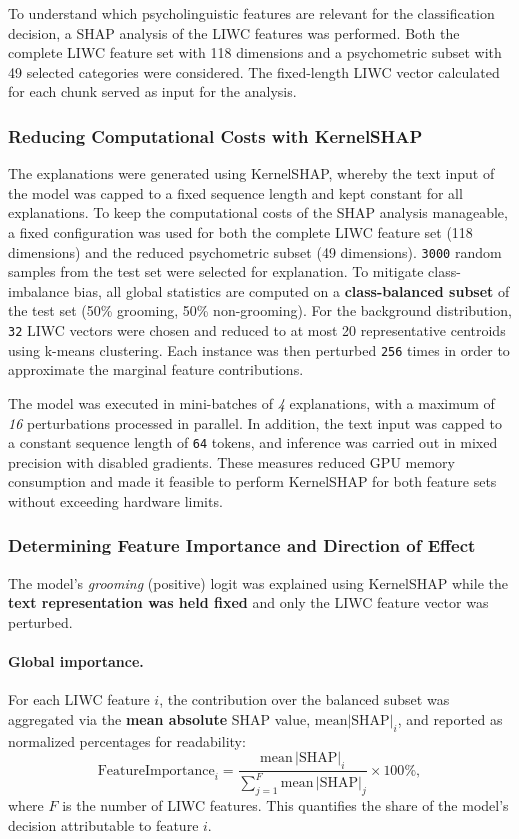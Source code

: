 To understand which psycholinguistic features are relevant for the classification decision, a SHAP analysis of the LIWC features was performed. Both the complete LIWC feature set with 118 dimensions and a psychometric subset with 49 selected categories were considered. The fixed-length LIWC vector calculated for each chunk served as input for the analysis. 

\subsubsection{Reducing Computational Costs with KernelSHAP}
The explanations were generated using KernelSHAP, whereby the text input of the model was capped to a fixed sequence length and kept constant for all explanations. To keep the computational costs of the SHAP analysis manageable, a fixed configuration was used for both the complete LIWC feature set (118 dimensions) and the reduced psychometric subset (49 dimensions).  \texttt{3000} random samples from the test set were selected for explanation. To mitigate class-imbalance bias, all global statistics are computed on a \textbf{class-balanced subset} of the test set (50\% grooming, 50\% non-grooming). For the background distribution, \texttt{32} LIWC vectors were chosen and reduced to at most 20 representative centroids using k-means clustering. Each instance was then perturbed \texttt{256} times in order to approximate the marginal feature contributions. 

The model was executed in mini-batches of \textit{4} explanations, with a maximum of \textit{16} perturbations processed in parallel. In addition, the text input was capped to a constant sequence length of \texttt{64} tokens, and inference was carried out in mixed precision with disabled gradients. These measures reduced GPU memory consumption and made it feasible to perform KernelSHAP for both feature sets without exceeding hardware limits.

\subsubsection{Determining Feature Importance and Direction of Effect}

The model’s \emph{grooming} (positive) logit was explained using KernelSHAP while the \textbf{text representation was held fixed} and only the LIWC feature vector was perturbed.

\paragraph{Global importance.}
For each LIWC feature $i$, the contribution over the balanced subset was aggregated via the \textbf{mean absolute} SHAP value, $\mathrm{mean}|\mathrm{SHAP}|_i$, and reported as normalized percentages for readability:
\[
\text{FeatureImportance}_{i}
= \frac{\mathrm{mean}\,|\mathrm{SHAP}|_{i}}{\sum_{j=1}^{F} \mathrm{mean}\,|\mathrm{SHAP}|_{j}} \times 100\% ,
\]
where $F$ is the number of LIWC features. This quantifies the share of the model’s decision attributable to feature $i$.

